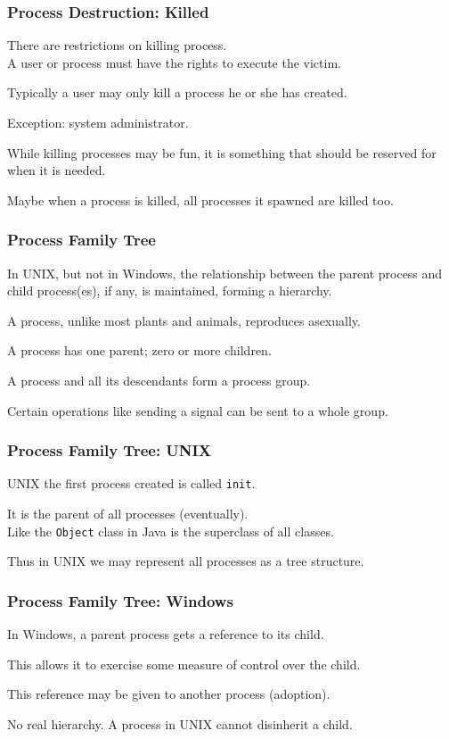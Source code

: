 \begin{frame}
\frametitle{Process Destruction: Killed}

There are restrictions on killing process.\\
\quad A user or process must have the rights to execute the victim. 

Typically a user may only kill a process he or she has created.

Exception: system administrator. 

While killing processes may be fun, it is something that should be reserved for when it is needed.

Maybe when a process is killed, all processes it spawned are killed too.


\end{frame}


\begin{frame}
\frametitle{Process Family Tree}
In UNIX, but not in Windows, the relationship between the parent process and child process(es), if any, is maintained, forming a hierarchy.

A process, unlike most plants and animals, reproduces asexually.

A process has one parent; zero or more children.

A process and all its descendants form a \alert{process group}.

Certain operations like sending a signal can be sent to a whole group.

\end{frame}

\begin{frame}
\frametitle{Process Family Tree: UNIX}
UNIX the first process created is called \texttt{init}.

It is the parent of all processes (eventually).\\
\quad Like the \texttt{Object} class in Java is the superclass of all classes.

Thus in UNIX we may represent all processes as a tree structure.

\end{frame}

\begin{frame}
\frametitle{Process Family Tree: Windows}

In Windows, a parent process gets a reference to its child.

This allows it to exercise some measure of control over the child. 

This reference may be given to another process (adoption).

No real hierarchy. A process in UNIX cannot disinherit a child.


\end{frame}

